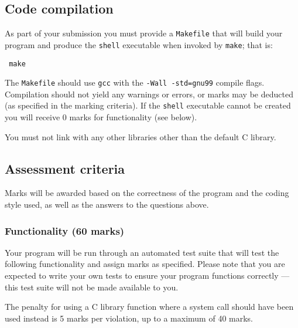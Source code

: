 \documentclass[12pt,a4paper]{article}
\begin{document}
\subsection*{Code compilation}

As part of your submission you must provide a \texttt{Makefile} that will build
your program and produce the \texttt{shell} executable when invoked by
\texttt{make}; that is:

\begin{verbatim} make \end{verbatim}

The \texttt{Makefile} should use \texttt{gcc} with the \texttt{-Wall
-std=gnu99} compile flags.  Compilation should not yield any warnings or
errors, or marks may be deducted (as specified in the marking criteria).  If
the \texttt{shell} executable cannot be created you will receive 0 marks for
functionality (see below).

You must not link with any other libraries other than the default C library.





\subsection*{Assessment criteria}

Marks will be awarded based on the correctness of the program and the coding
style used, as well as the answers to the questions above.

\subsubsection*{Functionality (60 marks)}

Your program will be run through an automated test suite that will test the
following functionality and assign marks as specified. Please note that you are
expected to write your own tests to ensure your program functions correctly ---
this test suite will not be made available to you.

The penalty for using a C library function where a system call should have been
used instead is 5 marks per violation, up to a maximum of 40 marks.
\end{document}
